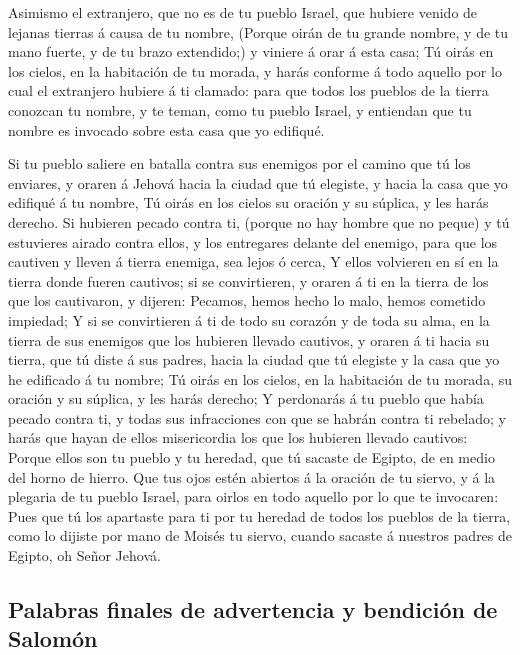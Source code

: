  Asimismo el extranjero, que no es de tu pueblo Israel,
que hubiere venido de lejanas tierras á causa de tu nombre,
 (Porque oirán de tu grande nombre, y de tu mano fuerte,
y de tu brazo extendido;) y viniere á orar á esta casa; 
Tú oirás en los cielos, en la habitación de tu morada, y harás conforme
á todo aquello por lo cual el extranjero hubiere á ti clamado: para que
todos los pueblos de la tierra conozcan tu nombre, y te teman, como tu
pueblo Israel, y entiendan que tu nombre es invocado sobre esta casa que
yo edifiqué.

 Si tu pueblo saliere en batalla contra sus enemigos por
el camino que tú los enviares, y oraren á Jehová hacia la ciudad que tú
elegiste, y hacia la casa que yo edifiqué á tu nombre, 
Tú oirás en los cielos su oración y su súplica, y les harás derecho.
 Si hubieren pecado contra ti, (porque no hay hombre que
no peque) y tú estuvieres airado contra ellos, y los entregares delante
del enemigo, para que los cautiven y lleven á tierra enemiga, sea lejos
ó cerca,  Y ellos volvieren en sí en la tierra donde
fueren cautivos; si se convirtieren, y oraren á ti en la tierra de los
que los cautivaron, y dijeren: Pecamos, hemos hecho lo malo, hemos
cometido impiedad;  Y si se convirtieren á ti de todo su
corazón y de toda su alma, en la tierra de sus enemigos que los hubieren
llevado cautivos, y oraren á ti hacia su tierra, que tú diste á sus
padres, hacia la ciudad que tú elegiste y la casa que yo he edificado á
tu nombre;  Tú oirás en los cielos, en la habitación de
tu morada, su oración y su súplica, y les harás derecho; 
Y perdonarás á tu pueblo que había pecado contra ti, y todas sus
infracciones con que se habrán contra ti rebelado; y harás que hayan de
ellos misericordia los que los hubieren llevado cautivos:
 Porque ellos son tu pueblo y tu heredad, que tú sacaste
de Egipto, de en medio del horno de hierro.  Que tus ojos
estén abiertos á la oración de tu siervo, y á la plegaria de tu pueblo
Israel, para oirlos en todo aquello por lo que te invocaren:
 Pues que tú los apartaste para ti por tu heredad de
todos los pueblos de la tierra, como lo dijiste por mano de Moisés tu
siervo, cuando sacaste á nuestros padres de Egipto, oh Señor Jehová.

\hypertarget{palabras-finales-de-advertencia-y-bendiciuxf3n-de-salomuxf3n}{%
\subsection{Palabras finales de advertencia y bendición de
Salomón}\label{palabras-finales-de-advertencia-y-bendiciuxf3n-de-salomuxf3n}}

